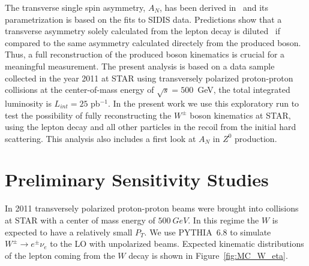\documentclass[12pt]{article}
\begin{document}
The transverse single spin asymmetry, $A_N$, has been derived in~\cite{Kang:2009bp} and its parametrization is based on the fits to SIDIS data.
Predictions show that a transverse asymmetry solely calculated from the lepton decay is diluted~\cite{Kang:2009bp} if compared to the same asymmetry calculated directely from the produced boson. 
Thus, a full reconstruction of the produced boson kinematics is crucial for a meaningful measurement.
The present analysis is based on a data sample collected in the year 2011 at STAR using transversely polarized proton-proton collisions at the center-of-mass energy of $\sqrt{s}=500$~GeV, the total integrated luminosity is $L_{int} = 25$ pb$^{-1}$. In the present work we use this exploratory run to test the possibility of fully reconstructing the $W^{\pm}$ boson kinematics at STAR, using the lepton decay and all other particles in the recoil from the initial hard scattering. This analysis also includes a first look at $A_{N}$ in $Z^{0}$ production. 

%
%
%


\section{Preliminary Sensitivity Studies}

In 2011 transversely polarized proton-proton beams were brought into collisions
at STAR with a center of mass energy of $500~GeV$. In this regime the $W$ is
expected to have a relatively small $P_T$. 
We use PYTHIA~6.8 to
simulate $W^\pm \to e^\pm \nu_e$ to the LO with unpolarized beams. Expected
kinematic distributions of the lepton coming from the $W$ decay is shown in
Figure~\ref{fig:MC_W_eta}.
\end{document}
